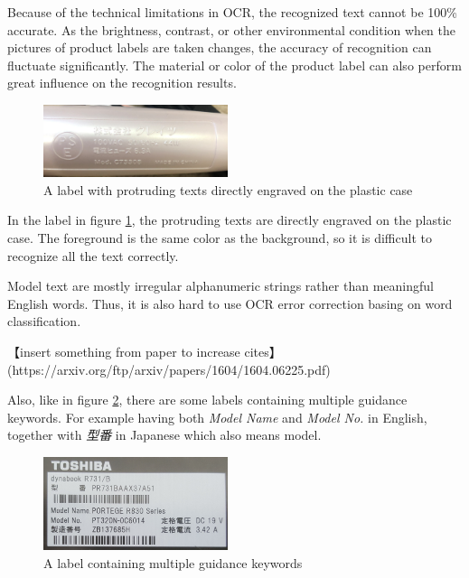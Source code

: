 \documentclass[technicalreport]{ieicej}
\begin{document}
        Because of the technical limitations in OCR, the recognized text cannot be 100\% accurate. As the brightness, contrast, or other environmental condition when the pictures of product labels are taken changes, the accuracy of recognition can fluctuate significantly. The material or color of the product label can also perform great influence on the recognition results.
        
        \begin{figure}[t] 
            \begin{center}
            \includegraphics[width=0.48\textwidth]{figure/plastic.png}
            \end{center}
            \caption{A label with protruding texts directly engraved on the plastic case}
            \label{fig:plastic}
        \end{figure}

        In the label in figure \ref{fig:plastic}, the protruding texts are directly engraved on the plastic case. The foreground is the same color as the background, so it is difficult to recognize all the text correctly.

        Model text are mostly irregular alphanumeric strings rather than meaningful English words. Thus, it is also hard to use OCR error correction basing on word classification.
        
        \vspace*{\baselineskip}

        【insert something from paper to increase cites】\\
        (https://arxiv.org/ftp/arxiv/papers/1604/1604.06225.pdf)

        \vspace*{\baselineskip}
        
        Also, like in figure \ref{fig:3models}, there are some labels containing multiple guidance keywords. For example having both {\em Model Name} and {\em Model No.} in English, together with {\em 型番} in Japanese which also means model.

        \begin{figure}[t] 
            \begin{center}
            \includegraphics[width=0.48\textwidth]{figure/3models.png}
            \end{center}
            \caption{A label containing multiple guidance keywords}
            \label{fig:3models}
        \end{figure}
\end{document}
